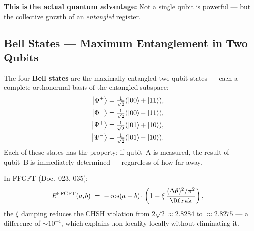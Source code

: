 \begin{center}
\end{center}

\textbf{This is the actual quantum advantage:}
Not a single qubit is powerful ---
but the collective growth of an
\emph{entangled} register.

\subsection{Bell States --- Maximum Entanglement in Two Qubits}
\label{sec:bell}

The four \textbf{Bell states} are the
maximally entangled two-qubit states ---
each a complete orthonormal basis
of the entangled subspace:
\begin{align}
  \left|\Phi^+\right\rangle &= \tfrac{1}{\sqrt{2}}(\left|00\right\rangle + \left|11\right\rangle), \\
  \left|\Phi^-\right\rangle &= \tfrac{1}{\sqrt{2}}(\left|00\right\rangle - \left|11\right\rangle), \\
  \left|\Psi^+\right\rangle &= \tfrac{1}{\sqrt{2}}(\left|01\right\rangle + \left|10\right\rangle), \\
  \left|\Psi^-\right\rangle &= \tfrac{1}{\sqrt{2}}(\left|01\right\rangle - \left|10\right\rangle).
\end{align}
Each of these states has the property:
if qubit~A is measured, the result of qubit~B
is immediately determined --- regardless of how far away.

In FFGFT (Doc.~023, 035):
\begin{equation}
  E^{\text{FFGFT}}(a, b) \;=\;
  -\cos(a - b) \cdot
  \left(1 - \xi\,\frac{(\Delta\theta)^2/\pi^2}{\Dfrak}\right),
\end{equation}
the $\xi$ damping reduces the CHSH violation from
$2\sqrt{2} \approx 2.8284$ to
$\approx 2.8275$ --- a difference of
$\sim 10^{-4}$, which explains non-locality locally
without eliminating it.

